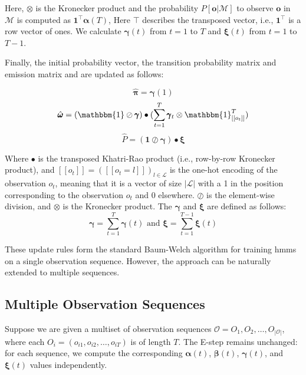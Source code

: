 Here, $\otimes$ is the Kronecker product and the probability $P[\mathbf{o} | \mathcal{M}]$ to observe $\mathbf{o}$ in $\mathcal{M}$ is computed as $\mathbf{1}^\top \pmb{\alpha}(T)$, Here $\top$ describes the transposed vector, i.e., $\mathbf{1}^\top$ is a row vector of ones.
We calculate $\pmb{\gamma}(t)$ from $t= 1$ to $T$ and $\pmb{\xi}(t)$ from $t= 1$ to $T-1$.

Finally, the initial probability vector, the transition probability matrix and emission matrix and are updated as follows:

\begin{equation}
    \hat{\pmb{\pi}} = \pmb{\gamma}(1)
    \label{eq:initial-probabilities-update}
\end{equation}
\begin{equation}
    \hat{\pmb{\omega}} = (\mathbbm{1} \oslash \pmb{\gamma}) \bullet (\sum_{t=1}^{T} \pmb{\gamma}_t \otimes \mathbbm{1}_{[[o_t]]}^{T})
    \label{eq:emission-probabilities-update}
\end{equation}
\begin{equation}
    \hat{P} = (\mathbf{1} \oslash \pmb{\gamma} ) \bullet \pmb{\xi}
    \label{eq:transition-probabilities-update}
\end{equation}

Where $\bullet$ is the transposed Khatri-Rao product (i.e., row-by-row Kronecker product), and $[[o_t]] = ([[o_t=l]])_{l \in \mathcal{L}}$ is the one-hot encoding of the observation $o_t$, meaning that it is a vector of size $|\mathcal{L}|$ with a 1 in the position corresponding to the observation $o_t$ and 0 elsewhere.
$\oslash$ is the element-wise division, and $\otimes$ is the Kronecker product.
The $\pmb{\gamma}$ and $\pmb{\xi}$ are defined as follows:
\begin{equation}
    \pmb{\gamma} = \sum_{t=1}^{T} \pmb{\gamma}(t) \text{ and } \pmb{\xi} = \sum_{t=1}^{T-1} \pmb{\xi}(t)
    \label{eq:gamma-xi-definitions}
\end{equation}

These update rules form the standard Baum-Welch algorithm for training \glspl{hmm} on a single observation sequence.
However, the approach can be naturally extended to multiple sequences.

\subsection{Multiple Observation Sequences}\label{subsec:multiple-observation-sequences}
Suppose we are given a multiset of observation sequences $\mathcal{O} = {O_1, O_2, \ldots, O_{|\mathcal{O}|}}$, where each $O_i = (o_{i1}, o_{i2}, \ldots, o_{iT})$ is of length $T$.
The E-step remains unchanged: for each sequence, we compute the corresponding $\pmb{\alpha}(t)$, $\pmb{\beta}(t)$, $\pmb{\gamma}(t)$, and $\pmb{\xi}(t)$ values independently.

